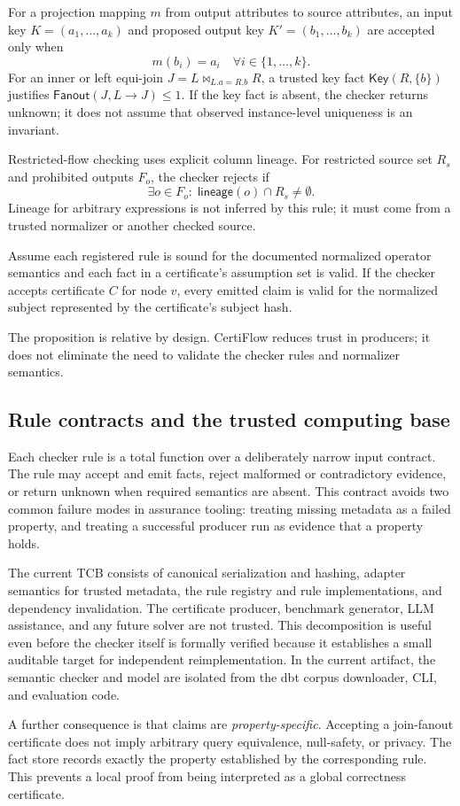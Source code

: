 For a projection mapping $m$ from output attributes to source attributes, an input key $K=(a_1,\ldots,a_k)$ and proposed output key $K'=(b_1,\ldots,b_k)$ are accepted only when
\[
  m(b_i)=a_i \quad \forall i\in\{1,\ldots,k\}.
\]
For an inner or left equi-join $J=L\bowtie_{L.a=R.b}R$, a trusted key fact $\mathsf{Key}(R,\{b\})$ justifies $\mathsf{Fanout}(J,L\rightarrow J)\leq 1$. If the key fact is absent, the checker returns \textsf{unknown}; it does not assume that observed instance-level uniqueness is an invariant.

Restricted-flow checking uses explicit column lineage. For restricted source set $R_s$ and prohibited outputs $F_o$, the checker rejects if
\[
  \exists o\in F_o:\;\mathsf{lineage}(o)\cap R_s\neq\emptyset.
\]
Lineage for arbitrary expressions is not inferred by this rule; it must come from a trusted normalizer or another checked source.

\begin{proposition}
Assume each registered rule is sound for the documented normalized operator semantics and each fact in a certificate's assumption set is valid. If the checker accepts certificate $C$ for node $v$, every emitted claim is valid for the normalized subject represented by the certificate's subject hash.
\end{proposition}

The proposition is relative by design. CertiFlow reduces trust in producers; it does not eliminate the need to validate the checker rules and normalizer semantics.

\subsection{Rule contracts and the trusted computing base}

Each checker rule is a total function over a deliberately narrow input contract. The rule may accept and emit facts, reject malformed or contradictory evidence, or return \textsf{unknown} when required semantics are absent. This contract avoids two common failure modes in assurance tooling: treating missing metadata as a failed property, and treating a successful producer run as evidence that a property holds.

The current TCB consists of canonical serialization and hashing, adapter semantics for trusted metadata, the rule registry and rule implementations, and dependency invalidation. The certificate producer, benchmark generator, LLM assistance, and any future solver are not trusted. This decomposition is useful even before the checker itself is formally verified because it establishes a small auditable target for independent reimplementation. In the current artifact, the semantic checker and model are isolated from the dbt corpus downloader, CLI, and evaluation code.

A further consequence is that claims are \emph{property-specific}. Accepting a join-fanout certificate does not imply arbitrary query equivalence, null-safety, or privacy. The fact store records exactly the property established by the corresponding rule. This prevents a local proof from being interpreted as a global correctness certificate.
